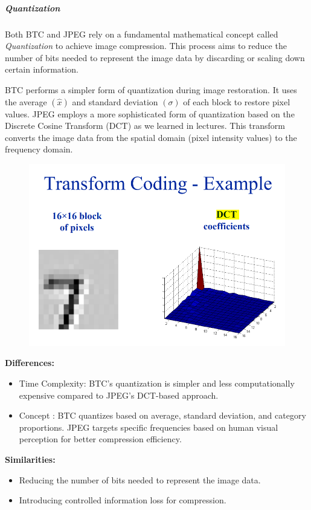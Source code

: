 \documentclass[letterpaper, 12pt]{article}
\begin{document}
\subparagraph{Quantization}

Both BTC and JPEG rely on a fundamental mathematical concept called \textit{Quantization} to achieve image compression. This process aims to reduce the number of bits needed to represent the image data by discarding or scaling down certain information.

 BTC performs a simpler form of quantization during image restoration. It uses the average $(\hat{x})$ and standard deviation $(\sigma)$ of each block to restore pixel values.
 JPEG employs a more sophisticated form of quantization based on the Discrete Cosine Transform (DCT) as we learned in lectures. This transform converts the image data from the spatial domain (pixel intensity values) to the frequency domain.  

\begin{figure}[htbp]
    \centering
    \includegraphics[width=0.75\linewidth]{FINAL_ASSIGNMENT/Example.png}
    
    
\end{figure}
 \textbf{Differences:}
\begin{itemize}
    \item Time Complexity: BTC's quantization is simpler and less computationally expensive compared to JPEG's DCT-based approach.
    \item Concept : BTC quantizes based on average, standard deviation, and category proportions. JPEG targets specific frequencies based on human visual perception for better compression efficiency.
\end{itemize}

 \textbf{Similarities:}
\begin{itemize}
    \item Reducing the number of bits needed to represent the image data.
    \item Introducing controlled information loss for compression.
\end{itemize}
 
\end{document}

